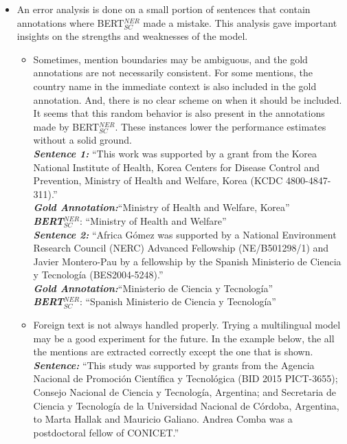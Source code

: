\documentclass{report}
\theoremstyle{definition}
\theoremstyle{remark}
\begin{document}
\begin{itemize}
    \item An error analysis is done on a small portion of sentences that contain annotations where BERT$_{SC}^{NER}$ made a mistake. This analysis gave important insights on the strengths and weaknesses of the model.
    \begin{itemize}
        \item Sometimes, mention boundaries may be ambiguous, and the gold annotations are not necessarily consistent. For some mentions, the country name in the immediate context is also included in the gold annotation. And, there is no clear scheme on when it should be included. It seems that this random behavior is also present in the annotations made by BERT$_{SC}^{NER}$. These instances lower the performance estimates without a solid ground. \\
        \newline
        \textbf{\textit{Sentence 1:}} ``This work was supported by a grant from the Korea National Institute of Health, Korea Centers for Disease Control and Prevention, Ministry of Health and Welfare, Korea (KCDC 4800-4847-311).'' \\
        \textbf{\textit{Gold Annotation:}}``Ministry of Health and Welfare, Korea''\\
        \textbf{\textit{BERT}}$_{SC}^{NER}$: ``Ministry of Health and Welfare''\\
        \newline
        \textbf{\textit{Sentence 2:}} ``Africa Gómez was supported by a National Environment Research Council (NERC) Advanced Fellowship (NE/B501298/1) and Javier Montero-Pau by a fellowship by the Spanish Ministerio de Ciencia y Tecnología (BES2004-5248).''\\
        \textbf{\textit{Gold Annotation:}}``Ministerio de Ciencia y Tecnología''\\
        \textbf{\textit{BERT}}$_{SC}^{NER}$: ``Spanish Ministerio de Ciencia y Tecnología''
         \newline
        \item Foreign text is not always handled properly. Trying a multilingual model may be a good experiment for the future. In the example below, the all the mentions are extracted correctly except the one that is shown.\\
        \newline
        \textbf{\textit{Sentence:}} ``This study was supported by grants from the Agencia Nacional de Promoción Científica y Tecnológica (BID 2015 PICT-3655); Consejo Nacional de Ciencia y Tecnología, Argentina; and Secretaria de Ciencia y Tecnología de la Universidad Nacional de Córdoba, Argentina, to Marta Hallak and Mauricio Galiano. Andrea Comba was a postdoctoral fellow of CONICET.''\\

\end{itemize}
\end{itemize}
\end{document}
